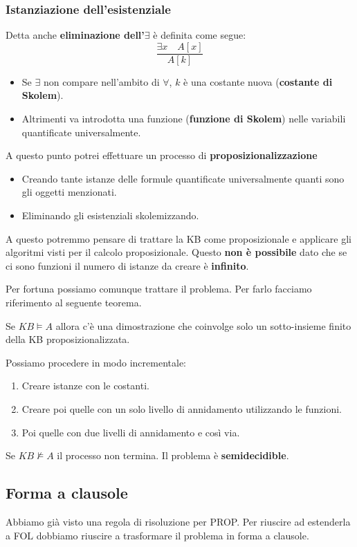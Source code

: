 \subsubsection{Istanziazione dell'esistenziale}
Detta anche \textbf{eliminazione dell'$\exists$} \`e definita come segue:
\[ \frac{\exists x \quad A[x]}{A[k]} \]
\begin{itemize}
	\item Se $\exists$ non compare nell'ambito di $\forall$, $k$ \`e una costante nuova (\textbf{costante di Skolem}).
	\item Altrimenti va introdotta una funzione (\textbf{funzione di Skolem}) nelle variabili quantificate
	      universalmente.
\end{itemize}
A questo punto potrei effettuare un processo di \textbf{proposizionalizzazione}
\begin{itemize}
	\item Creando tante istanze delle formule quantificate universalmente quanti sono gli oggetti menzionati.
	\item Eliminando gli esistenziali skolemizzando.
\end{itemize}
A questo potremmo pensare di trattare la KB come proposizionale e applicare gli algoritmi visti per
il calcolo proposizionale. Questo \textbf{non \`e possibile} dato che se ci sono funzioni il numero di istanze
da creare \`e \textbf{infinito}.

Per fortuna possiamo comunque trattare il problema. Per farlo facciamo riferimento al seguente teorema.
\begin{theorem}
	Se $KB \models A$ allora c'\`e una dimostrazione che coinvolge solo un sotto-insieme finito della KB
	proposizionalizzata.
\end{theorem}
Possiamo procedere in modo incrementale:
\begin{enumerate}
	\item Creare istanze con le costanti.
	\item Creare poi quelle con un solo livello di annidamento utilizzando le funzioni.
	\item Poi quelle con due livelli di annidamento e cos\`i via.
\end{enumerate}
Se $KB \not\models A$ il processo non termina. Il problema \`e \textbf{semidecidible}.

\subsection{Forma a clausole}
Abbiamo gi\`a visto una regola di risoluzione per PROP. Per riuscire ad estenderla a FOL dobbiamo riuscire a
trasformare il problema in forma a clausole.

